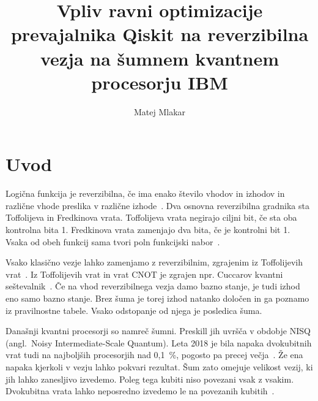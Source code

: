 \graphicspath{{Skupina10/img/}}

\title{Vpliv ravni optimizacije prevajalnika Qiskit na reverzibilna vezja na šumnem kvantnem procesorju IBM}
\author{Matej Mlakar}
\maketitle



\section{Uvod}
\label{g10:sec:uvod}

Logična funkcija je reverzibilna,
če ima enako število vhodov in izhodov
in različne vhode preslika v različne izhode~\cite{reversible:mraz}.
Dva osnovna reverzibilna gradnika
sta Toffolijeva in Fredkinova vrata.
Toffolijeva vrata negirajo ciljni bit,
če sta oba kontrolna bita 1.
Fredkinova vrata zamenjajo dva bita,
če je kontrolni bit 1.
Vsaka od obeh funkcij sama tvori
poln funkcijski nabor~\cite{reversible:mraz}.

Vsako klasično vezje lahko zamenjamo z reverzibilnim,
zgrajenim iz Toffolijevih vrat~\cite{nielsen2010}.
Iz Toffolijevih vrat in vrat CNOT
je zgrajen npr. Cuccarov kvantni seštevalnik~\cite{g10:cuccaro2004}.
Če na vhod reverzibilnega vezja damo bazno stanje,
je tudi izhod eno samo bazno stanje.
Brez šuma je torej izhod natanko določen
in ga poznamo iz pravilnostne tabele.
Vsako odstopanje od njega je posledica šuma.

Današnji kvantni procesorji so namreč šumni.
Preskill jih uvršča v obdobje NISQ
(angl.\ Noisy Intermediate-Scale Quantum).
Leta 2018 je bila napaka dvokubitnih vrat
tudi na najboljših procesorjih nad 0,1~\%,
pogosto pa precej večja~\cite{preskill2018}.
Že ena napaka kjerkoli v vezju lahko pokvari rezultat.
Šum zato omejuje velikost vezij,
ki jih lahko zanesljivo izvedemo.
Poleg tega kubiti niso povezani vsak z vsakim.
Dvokubitna vrata lahko neposredno izvedemo
le na povezanih kubitih~\cite{g10:qiskit_transpiler_stages}.

